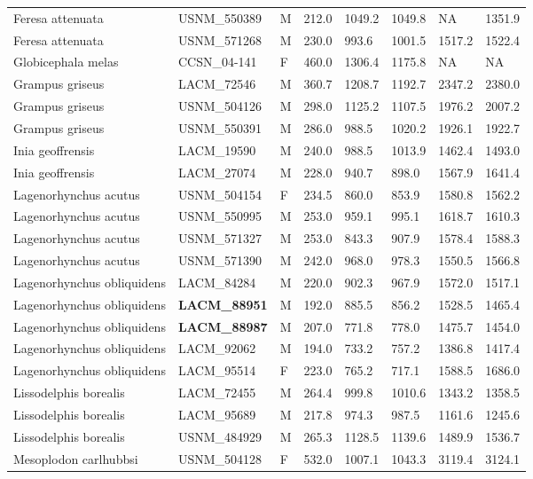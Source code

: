 \begin{longtable}{|p{1.95in}p{1.1in}p{.15in}p{.4in}p{.4in}p{.4in}p{.4in}p{.4in}|}
  Feresa attenuata & USNM\_550389 & M & 212.0 & 1049.2 & 1049.8 & NA & 1351.9 \\ 
  Feresa attenuata & USNM\_571268 & M & 230.0 & 993.6 & 1001.5 & 1517.2 & 1522.4 \\ 
  Globicephala melas & CCSN\_04-141 & F & 460.0 & 1306.4 & 1175.8 & NA & NA  \\ 
  Grampus griseus & LACM\_72546 & M & 360.7 & 1208.7 & 1192.7 & 2347.2 & 2380.0 \\ 
  Grampus griseus & USNM\_504126 & M & 298.0 & 1125.2 & 1107.5 & 1976.2 & 2007.2 \\ 
  Grampus griseus & USNM\_550391 & M & 286.0 & 988.5 & 1020.2 & 1926.1 & 1922.7 \\ 
  Inia geoffrensis & LACM\_19590 & M & 240.0 & 988.5 & 1013.9 & 1462.4 & 1493.0 \\ 
  Inia geoffrensis & LACM\_27074 & M & 228.0 & 940.7 & 898.0 & 1567.9 & 1641.4 \\ 
  Lagenorhynchus acutus & USNM\_504154 & F & 234.5 & 860.0 & 853.9 & 1580.8 & 1562.2 \\ 
  Lagenorhynchus acutus & USNM\_550995 & M & 253.0 & 959.1 & 995.1 & 1618.7 & 1610.3 \\ 
  Lagenorhynchus acutus & USNM\_571327 & M & 253.0 & 843.3 & 907.9 & 1578.4 & 1588.3 \\ 
  Lagenorhynchus acutus & USNM\_571390 & M & 242.0 & 968.0 & 978.3 & 1550.5 & 1566.8 \\ 
  Lagenorhynchus obliquidens & LACM\_84284 & M & 220.0 & 902.3 & 967.9 & 1572.0 & 1517.1 \\ 
  Lagenorhynchus obliquidens & \textbf{ LACM\_88951 } & M & 192.0 & 885.5 & 856.2 & 1528.5 & 1465.4 \\ 
  Lagenorhynchus obliquidens & \textbf{ LACM\_88987 } & M & 207.0 & 771.8 & 778.0 & 1475.7 & 1454.0 \\ 
  Lagenorhynchus obliquidens & LACM\_92062 & M & 194.0 & 733.2 & 757.2 & 1386.8 & 1417.4 \\ 
  Lagenorhynchus obliquidens & LACM\_95514 & F & 223.0 & 765.2 & 717.1 & 1588.5 & 1686.0 \\ 
  Lissodelphis borealis & LACM\_72455 & M & 264.4 & 999.8 & 1010.6 & 1343.2 & 1358.5 \\ 
  Lissodelphis borealis & LACM\_95689 & M & 217.8 & 974.3 & 987.5 & 1161.6 & 1245.6 \\ 
  Lissodelphis borealis & USNM\_484929 & M & 265.3 & 1128.5 & 1139.6 & 1489.9 & 1536.7 \\ 
  Mesoplodon carlhubbsi & USNM\_504128 & F & 532.0 & 1007.1 & 1043.3 & 3119.4 & 3124.1 \\ 

\end{longtable}
